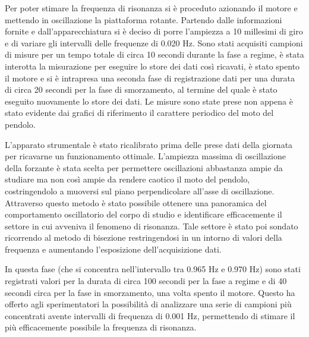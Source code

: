 Per poter stimare la frequenza di risonanza si è proceduto azionando il motore e mettendo in oscillazione la piattaforma rotante.
Partendo dalle informazioni fornite e dall’apparecchiatura si è deciso di porre l’ampiezza a 10 millesimi di giro e di variare gli
intervalli delle frequenze di 0.020 Hz. Sono stati acquisiti campioni di misure per un tempo totale di circa 10 secondi durante la fase a
regime, è stata interotta la misurazione per eseguire lo store dei dati così ricavati, è stato spento il motore e si è intrapresa una seconda
fase di registrazione dati per una durata di circa 20 secondi per la fase di smorzamento, al termine del quale è stato eseguito
nuovamente lo store dei dati. Le misure sono state prese non appena è stato evidente dai grafici di riferimento il carattere
periodico del moto del pendolo. 

L'apparato strumentale è stato ricalibrato prima delle prese dati della giornata per ricavarne un
funzionamento ottimale. L'ampiezza massima di oscillazione della forzante è stata scelta per permettere oscillazioni abbastanza
ampie da studiare ma non così ampie da rendere caotico il moto del pendolo, costringendolo a muoversi sul piano perpendicolare
all'asse di oscillazione. Attraverso questo metodo è stato possibile ottenere una panoramica del comportamento oscillatorio del 
corpo di studio e identificare efficacemente il settore in cui avveniva il fenomeno di risonanza. Tale settore è stato poi 
sondato ricorrendo al metodo di bisezione restringendosi in un intorno di valori della frequenza e aumentando l’esposizione 
dell’acquisizione dati. 

In questa fase (che si concentra nell’intervallo tra 0.965 Hz e 0.970 Hz) sono stati registrati valori per la durata di circa 100
secondi per la fase a regime e di 40 secondi circa per la fase in smorzamento, una volta spento il motore. Questo ha offerto agli
sperimentatori la possibilità di analizzare una serie di campioni più concentrati avente intervalli di frequenza di 0.001 Hz,
permettendo di stimare il più efficacemente possibile la frequenza di risonanza.
